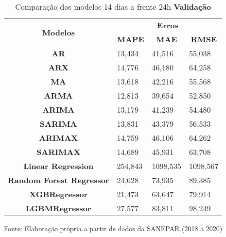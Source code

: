 \begin{table}[H]
	\centering
	\caption{Comparação dos modelos 14 dias a frente 24h \textbf{Validação} }\label{tb:30-24vld}
	\begin{tabular}{@{}clll@{}}
		\toprule
		\multirow{2}{*}{\textbf{Modelos}} & \multicolumn{3}{c}{\textbf{Erros}}                                                                       \\ \cmidrule(l){2-4} 
		& \multicolumn{1}{c}{\textbf{MAPE}} & \multicolumn{1}{c}{\textbf{MAE}} & \multicolumn{1}{c}{\textbf{RMSE}} \\ \hline
\textbf{AR}                       & 13,434                            & 41,516                           & 55,038                            \\
\textbf{ARX}                      & 14,776                            & 46,180                           & 64,258                            \\
\textbf{MA}                       & 13,618                            & 42,216                           & 55,568                            \\
\textbf{ARMA}                     & 12,813                            & 39,654                           & 52,850                            \\
\textbf{ARIMA}                    & 13,179                            & 41,239                           & 54,480                            \\
\textbf{SARIMA}                   & 13,831                            & 43,379                           & 56,533                            \\
\textbf{ARIMAX}                   & 14,759                            & 46,106                           & 64,262                            \\
\textbf{SARIMAX}                  & 14,689                            & 45,931                           & 63,708                            \\
\textbf{Linear Regression}        & 254,843                           & 1098,535                         & 1098,567                          \\
\textbf{Random Forest Regressor}  & 24,628                            & 73,935                           & 89,385                            \\
\textbf{XGBRegressor}             & 21,473                            & 63,647                           & 79,914                            \\
\textbf{LGBMRegressor}            & 27,577                            & 83,811                           & 98,249                            \\ \bottomrule
	\end{tabular}

Fonte: Elaboração própria a partir de dados da SANEPAR (2018 a 2020)
\end{table}

